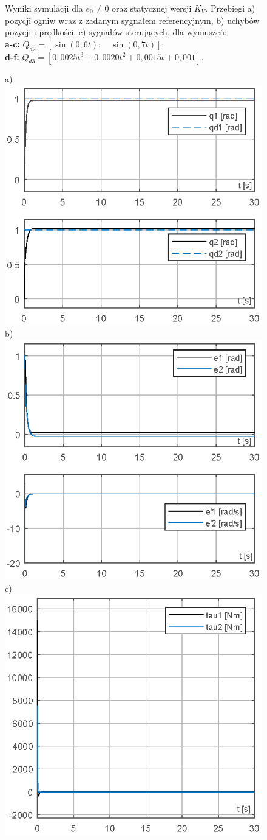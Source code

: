 \documentclass[12pt, a4paper, polish]{article}
\begin{document}
\begin{figure}[H]
{		Wyniki symulacji dla  $e_0\neq0$ oraz statycznej wersji $K_V$. Przebiegi a) pozycji ogniw wraz z zadanym sygnałem referencyjnym, b) uchybów pozycji i prędkości, c)  sygnałów sterujących, dla wymuszeń:\\
		\textbf{a-c:} $Q_{d2}=[\sin(0,6t);\quad \sin(0,7t)]$;\\
		\textbf{d-f:} $Q_{d3}=[0,0025t^3+0,0020t^2+0,0015t+0,001]$.}
\end{figure}
	\begin{figure}[H]\centering
	a) \includegraphics[width=0.30\columnwidth]{SRManCw5/SRManCw5_ZADANIE2/figs/04Pozycje} b)\includegraphics[width=0.30\columnwidth]{SRManCw5/SRManCw5_ZADANIE2/figs/04Uchyby} c)\includegraphics[width=0.30\columnwidth]{SRManCw5/SRManCw5_ZADANIE2/figs/04Sygnal}\\

\end{figure}
\end{document}
